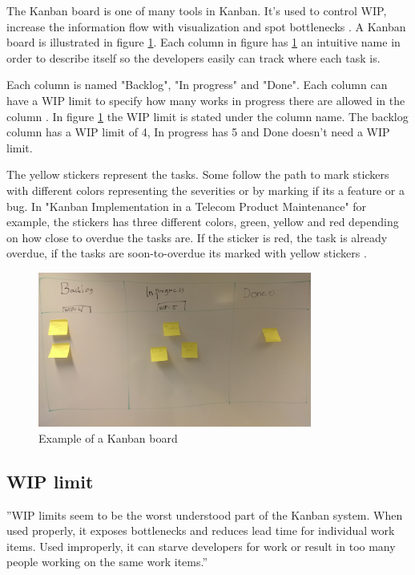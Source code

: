 \documentclass[UKenglish]{ifimaster}  %
\begin{document}
The Kanban board is one of many tools in Kanban. It's used to control WIP, increase the information flow with visualization and spot bottlenecks \parencite{SMR:SMR1599}. A Kanban board is illustrated in figure \ref{kanban_board}. Each column in figure has \ref{kanban_board} an intuitive name in order to describe itself so the developers easily can track where each task is. 

Each column is named "Backlog", "In progress" and "Done".  Each column can have a WIP limit to specify how many works in progress there are allowed in the column \parencite{Joyce}. In figure \ref{kanban_board} the WIP limit is stated under the column name. The backlog column has a WIP limit of 4, In progress has 5 and Done doesn't need a WIP limit. 

The yellow stickers represent the tasks. Some follow the path to mark stickers with different colors representing the severities or by marking if its a feature or a bug. In "Kanban Implementation in a Telecom Product Maintenance" for example, the stickers has three different colors, green, yellow and red depending on how close to overdue the tasks are. If the sticker is red, the task is already overdue, if the tasks are soon-to-overdue its marked with yellow stickers \parencite{6068363}.
\begin{figure}[!htbp]
\centering
\includegraphics[width=90mm]{Picture/kanban_board.jpg}
\caption{Example of a Kanban board}
\label{kanban_board}
\end{figure}

\subsection{WIP limit}
\label{WIPsec}
''WIP limits seem to be the worst understood part of the Kanban system. When used properly, it exposes bottlenecks and reduces lead time for individual work items. Used improperly, it can starve developers for work or result in too many people working on the same work items.'' \parencite{Shinkle}
\end{document}
